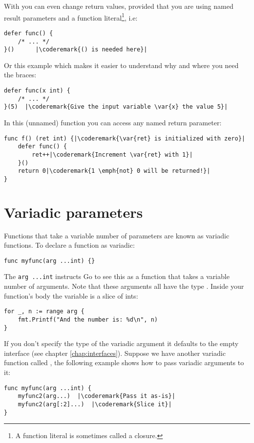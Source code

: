 With  you can even change return values, provided that
you are using named result parameters and a function
literal\footnote{A function literal
is sometimes called a  closure.}, i.e:
\begin{lstlisting}[caption=Function literal]
defer func() {
	/* ... */
}()		 |\coderemark{() is needed here}|
\end{lstlisting}
Or this example which makes it easier to understand why and where
you need the braces:
\begin{lstlisting}[caption=Function literal with parameters]
defer func(x int) {
	/* ... */
}(5)  |\coderemark{Give the input variable \var{x} the value 5}|
\end{lstlisting}
In this (unnamed) function you can access any named return
parameter:
\begin{lstlisting}[caption=Access return values within defer]
func f() (ret int) {|\coderemark{\var{ret} is initialized with zero}|
	defer func() {
		ret++|\coderemark{Increment \var{ret} with 1}|
	}()
	return 0|\coderemark{1 \emph{not} 0 will be returned!}|
}
\end{lstlisting}

\section{Variadic parameters}
Functions that take a variable number of parameters are known as variadic functions.
To declare a function as variadic:
\begin{lstlisting}
func myfunc(arg ...int) {}
\end{lstlisting}
The \lstinline{arg ...int} instructs Go to see this as a function that
takes a variable number of arguments. Note that these arguments all
have the type . Inside your function's body the variable
 is a slice of ints:
\begin{lstlisting}
for _, n := range arg {
    fmt.Printf("And the number is: %d\n", n)
}
\end{lstlisting}
If you don't specify the type of the variadic argument it defaults to the
empty interface  (see chapter
\ref{chap:interfaces}).
Suppose we have another variadic function called , the 
following example shows how to pass variadic arguments to it:
\begin{lstlisting}
func myfunc(arg ...int) {
    myfunc2(arg...)  |\coderemark{Pass it as-is}|
    myfunc2(arg[:2]...)  |\coderemark{Slice it}|
}
\end{lstlisting}


